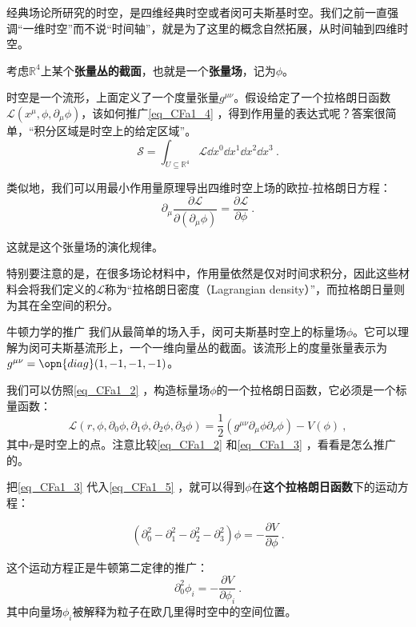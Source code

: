 经典场论所研究的时空，是四维经典时空或者闵可夫斯基时空。我们之前一直强调“一维时空”而不说“时间轴”，就是为了这里的概念自然拓展，从时间轴到四维时空。



考虑$\mathbb{R}^4$上某个\textbf{张量丛的截面}，也就是一个\textbf{张量场}，记为$\phi$。

时空是一个流形，上面定义了一个度量张量$g^{\mu\nu}$。假设给定了一个拉格朗日函数$\mathcal{L}(x^\mu, \phi, \partial_\mu\phi)$，该如何推广\autoref{eq_CFa1_4} ，得到作用量的表达式呢？答案很简单，“积分区域是时空上的给定区域”。
\begin{equation}
\mathcal{S} = \int_{U\subseteq \mathbb{R}^4} \mathcal{L}\dd x^0\dd x^1\dd x^2\dd x^3~.
\end{equation}

类似地，我们可以用最小作用量原理导出四维时空上场的欧拉-拉格朗日方程：
\begin{equation}\label{eq_CFa1_5}
\partial_\mu \frac{\partial\mathcal{L}}{\partial(\partial_\mu \phi)} = \frac{\partial\mathcal{L}}{\partial \phi}~.
\end{equation}

这就是这个张量场的演化规律。

特别要注意的是，在很多场论材料中，作用量依然是仅对时间求积分，因此这些材料会将我们定义的$\mathcal{L}$称为“拉格朗日密度（Lagrangian density）”，而拉格朗日量则为其在全空间的积分。

\begin{example}{牛顿力学的推广}\label{ex_CFa1_1}
我们从最简单的场入手，闵可夫斯基时空上的标量场$\phi$。它可以理解为闵可夫斯基流形上，一个一维向量丛的截面。该流形上的度量张量表示为$g^{\mu\nu}=\opn{diag}(1, -1, -1, -1)$。

我们可以仿照\autoref{eq_CFa1_2} ，构造标量场$\phi$的一个拉格朗日函数，它必须是一个标量函数：
\begin{equation}\label{eq_CFa1_3}
\mathcal{L}(r, \phi, \partial_0\phi, \partial_1\phi, \partial_2\phi, \partial_3\phi) = \frac{1}{2}(g^{\mu\nu}\partial_\mu\phi \partial_\nu\phi) - V(\phi)~,
\end{equation}
其中$r$是时空上的点。注意比较\autoref{eq_CFa1_2} 和\autoref{eq_CFa1_3} ，看看是怎么推广的。

把\autoref{eq_CFa1_3} 代入\autoref{eq_CFa1_5} ，就可以得到$\phi$在\textbf{这个拉格朗日函数}下的运动方程：

\begin{equation}
(\partial^2_0-\partial^2_1-\partial^2_2-\partial^2_3)\phi = -\frac{\partial V}{\partial \phi}~.
\end{equation}

这个运动方程正是牛顿第二定律的推广：
\begin{equation}
\partial^2_0 \phi_i = -\frac{\partial V}{\partial \phi_i}~.
\end{equation}
其中向量场$\phi_i$被解释为粒子在欧几里得时空中的空间位置。

\end{example}



